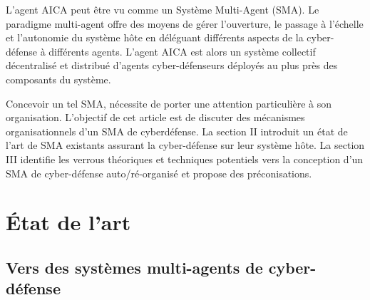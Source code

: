 


L'agent AICA peut être vu comme un Système Multi-Agent (SMA). Le paradigme multi-agent offre des moyens de gérer l'ouverture, le passage à l'échelle et l'autonomie du système hôte en déléguant différents aspects de la cyber-défense à différents agents. L'agent AICA  est alors un système collectif décentralisé et distribué d'agents cyber-défenseurs déployés au plus près des composants du système\cite{ieeesp_KottT20}.

Concevoir un tel SMA, nécessite de porter une attention particulière à son organisation. L'objectif de cet article est de discuter des mécanismes organisationnels d'un SMA de cyberdéfense.
La section II introduit un état de l'art de SMA existants assurant la cyber-défense sur leur système hôte. La section III identifie les verrous théoriques et techniques potentiels vers la conception d'un SMA de cyber-défense auto/ré-organisé et propose des préconisations.

\section{\'Etat de l'art}

\subsection{Vers des systèmes multi-agents de cyber-défense}



